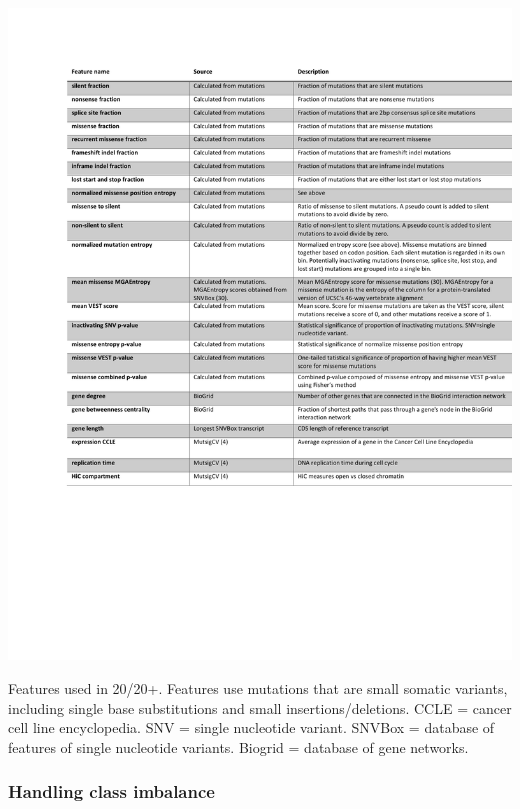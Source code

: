 \begin{table}
  \centering
  \makeatletter
  \let\@currsize\normalsize
  \includegraphics[width=\linewidth]{tables/chapter3/2020plus_features.pdf}
  \caption[Description of features used in 20/20+.]{Features used in 20/20+.  Features use mutations that are small somatic variants, including single base substitutions and small insertions/deletions. CCLE = cancer cell line encyclopedia.  SNV = single nucleotide variant.  SNVBox = database of features of single nucleotide variants.  Biogrid = database of gene networks.}
  \label{tab:2020features}
\end{table}

\subsubsection{Handling class imbalance}

